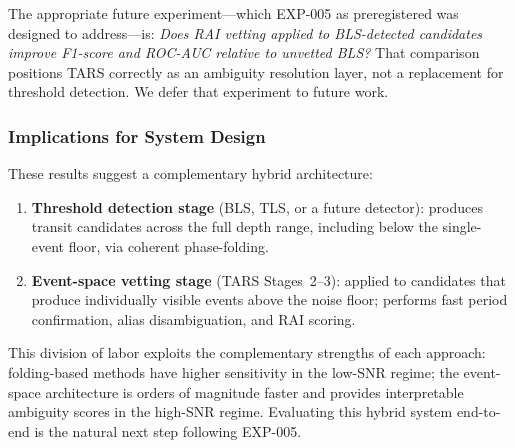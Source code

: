 The appropriate future experiment---which EXP-005 as preregistered was designed to address---is: \textit{Does RAI vetting applied to BLS-detected candidates improve F1-score and ROC-AUC relative to unvetted BLS?} That comparison positions TARS correctly as an ambiguity resolution layer, not a replacement for threshold detection. We defer that experiment to future work.

\subsubsection{Implications for System Design}

These results suggest a complementary hybrid architecture:

\begin{enumerate}
    \item \textbf{Threshold detection stage} (BLS, TLS, or a future detector): produces transit candidates across the full depth range, including below the single-event floor, via coherent phase-folding.
    \item \textbf{Event-space vetting stage} (TARS Stages~2--3): applied to candidates that produce individually visible events above the noise floor; performs fast period confirmation, alias disambiguation, and RAI scoring.
\end{enumerate}

This division of labor exploits the complementary strengths of each approach: folding-based methods have higher sensitivity in the low-SNR regime; the event-space architecture is orders of magnitude faster and provides interpretable ambiguity scores in the high-SNR regime. Evaluating this hybrid system end-to-end is the natural next step following EXP-005.

